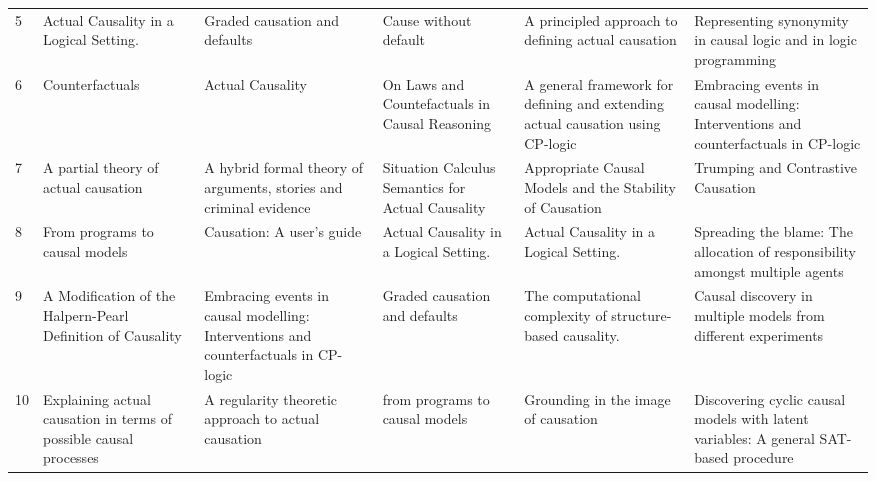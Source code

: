 \documentclass[11pt,a4paper]{book}
\theoremstyle{definition}
\theoremstyle{definition}
\theoremstyle{definition}
\theoremstyle{remark}
\begin{document}
\begin{table}
\begin{tabular}{l p{3.7cm} p{3.7cm}p{3.7cm} p{3.7cm}p{3.7cm} }
5  &                           Actual Causality in a Logical Setting. &                                                              Graded causation and defaults &                                                     Cause without default&                                        A principled approach to defining actual causation &                             Representing synonymity in causal logic and in logic programming \\
6  &                                                    Counterfactuals &                                                                            Actual Causality &                            On Laws and Countefactuals in Causal Reasoning &           A general framework for defining and extending actual causation using CP-logic &         Embracing events in causal modelling: Interventions and counterfactuals in CP-logic \\
7  &                              A partial theory of actual causation &                          A hybrid formal theory of arguments, stories and criminal evidence &                         Situation Calculus Semantics for Actual Causality &                                  Appropriate Causal Models and the Stability of Causation &                                                          Trumping and Contrastive Causation \\
8  &                                    From programs to causal models&                                                                   Causation: A user's guide &                                    Actual Causality in a Logical Setting. &                                                    Actual Causality in a Logical Setting. &               Spreading the blame: The allocation of responsibility amongst multiple agents \\
9  &        A Modification of the Halpern-Pearl Definition of Causality &         Embracing events in causal modelling: Interventions and counterfactuals in CP-logic &                                              Graded causation and defaults&                                The computational complexity of structure-based causality. &                             Causal discovery in multiple models from different experiments \\
10  &  Explaining actual causation in terms of possible causal processes &                                        A regularity theoretic approach to actual causation &                                             from programs to causal models &                                                       Grounding in the image of causation &       Discovering cyclic causal models with latent variables: A general SAT-based procedure \\

\end{tabular}
\end{table}
\end{document}
